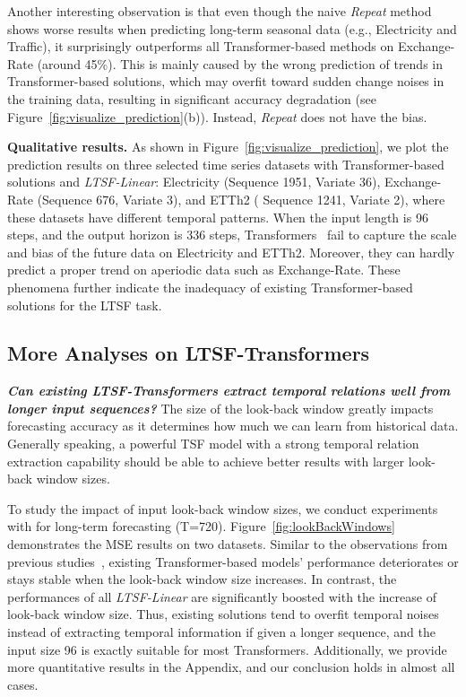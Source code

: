 \documentclass[10pt,twocolumn,letterpaper]{article}
\newcommand{\modelname}{\emph{LTSF-Linear}\xspace}
\begin{document}
Another interesting observation is that even though the naive \emph{Repeat} method shows worse results when predicting long-term seasonal data (e.g., Electricity and Traffic), it surprisingly outperforms all Transformer-based methods on Exchange-Rate (around 45\%). 
This is mainly caused by the wrong prediction of trends in Transformer-based solutions, which may overfit toward sudden change noises in the training data, resulting in significant accuracy degradation (see Figure~\ref{fig:visualize_prediction}(b)). Instead, \emph{Repeat} does not have the bias.


\textbf{Qualitative results.}
As shown in Figure~\ref{fig:visualize_prediction}, we plot the prediction results on three selected time series datasets with Transformer-based solutions and \modelname: Electricity (Sequence 1951, Variate 36), Exchange-Rate (Sequence 676, Variate 3), and ETTh2 ( Sequence 1241, Variate 2), where these datasets have different temporal patterns. When the input length is 96 steps, and the output horizon is 336 steps, Transformers~\cite{informer,xu2021autoformer,zhou2022fedformer} fail to capture the scale and bias of the future data on Electricity and ETTh2. Moreover, they can hardly predict a proper trend on aperiodic data such as Exchange-Rate. These phenomena further indicate the inadequacy of existing Transformer-based solutions for the LTSF task.



\subsection{More Analyses on LTSF-Transformers}
\label{subsec:TransformerModelDesign}

\textbf{\emph{Can existing LTSF-Transformers extract temporal relations well from longer input sequences?}}
The size of the look-back window greatly impacts forecasting accuracy as it determines how much we can learn from historical data. Generally speaking, a powerful TSF model with a strong temporal relation extraction capability should be able to achieve better results with larger look-back window sizes.


To study the impact of input look-back window sizes, we conduct experiments with  for long-term forecasting (T=720).
Figure~\ref{fig:lookBackWindows} demonstrates the MSE results on two datasets. 
Similar to the observations from previous studies~\cite{informer,wen2022transformers}, existing Transformer-based models' performance deteriorates or stays stable when the look-back window size increases. In contrast, the performances of all \modelname are significantly boosted with the increase of look-back window size. 
Thus, existing solutions tend to overfit temporal noises instead of extracting temporal information if given a longer sequence, and the input size 96 is exactly suitable for most Transformers.
Additionally, we provide more quantitative results in the Appendix, and our conclusion holds in almost all cases. 
\end{document}
